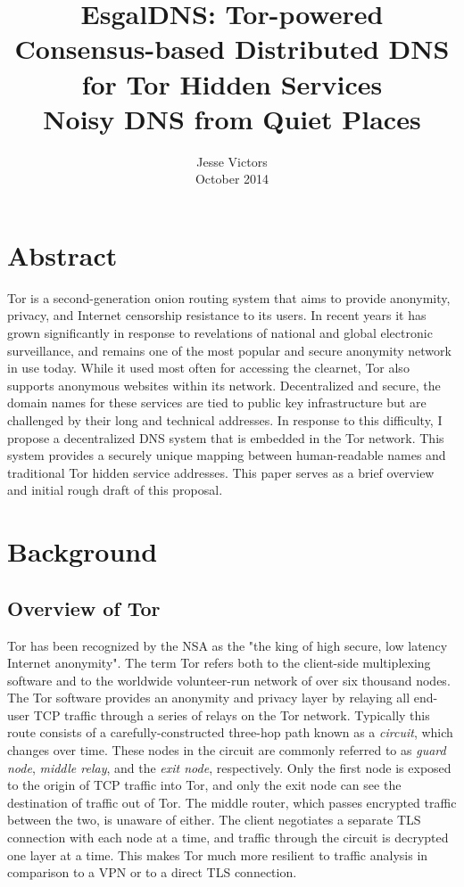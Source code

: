 \documentclass[journal]{IEEEtran}
\begin{document}
\title{EsgalDNS: Tor-powered Consensus-based Distributed DNS for Tor Hidden Services\\ \Large Noisy DNS from Quiet Places}
\author{Jesse Victors \\ October 2014}

\maketitle

\section{Abstract}

Tor is a second-generation onion routing system that aims to provide anonymity, privacy, and Internet censorship resistance to its users. In recent years it has grown significantly in response to revelations of national and global electronic surveillance, and remains one of the most popular and secure anonymity network in use today. While it used most often for accessing the clearnet, Tor also supports anonymous websites within its network. Decentralized and secure, the domain names for these services are tied to public key infrastructure but are challenged by their long and technical addresses. In response to this difficulty, I propose a decentralized DNS system that is embedded in the Tor network. This system provides a securely unique mapping between human-readable names and traditional Tor hidden service addresses. This paper serves as a brief overview and initial rough draft of this proposal.

\section{Background}

\subsection{Overview of Tor}

Tor has been recognized by the NSA as the "the king of high secure, low latency Internet anonymity". The term Tor refers both to the client-side multiplexing software and to the worldwide volunteer-run network of over six thousand nodes. The Tor software provides an anonymity and privacy layer by relaying all end-user TCP traffic through a series of relays on the Tor network. Typically this route consists of a carefully-constructed three-hop path known as a \textit{circuit}, which changes over time. These nodes in the circuit are commonly referred to as \textit{guard node}, \textit{middle relay}, and the \textit{exit node}, respectively. Only the first node is exposed to the origin of TCP traffic into Tor, and only the exit node can see the destination of traffic out of Tor. The middle router, which passes encrypted traffic between the two, is unaware of either. The client negotiates a separate TLS connection with each node at a time, and traffic through the circuit is decrypted one layer at a time. This makes Tor much more resilient to traffic analysis in comparison to a VPN or to a direct TLS connection.
\end{document}
